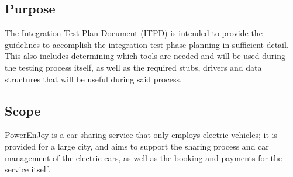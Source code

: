 \subsection{Purpose}
The Integration Test Plan Document (ITPD) is intended to provide the guidelines to accomplish the integration test phase planning in sufficient detail. This also includes determining which tools are needed and will be used during the testing process itself, as well as the required stubs, drivers and data structures that will be useful during said process.

\subsection{Scope}
PowerEnJoy is a car sharing service that only employs electric vehicles; it is provided for a large city, and aims to support the sharing process and car management of the electric cars, as well as the booking and payments for the service itself.